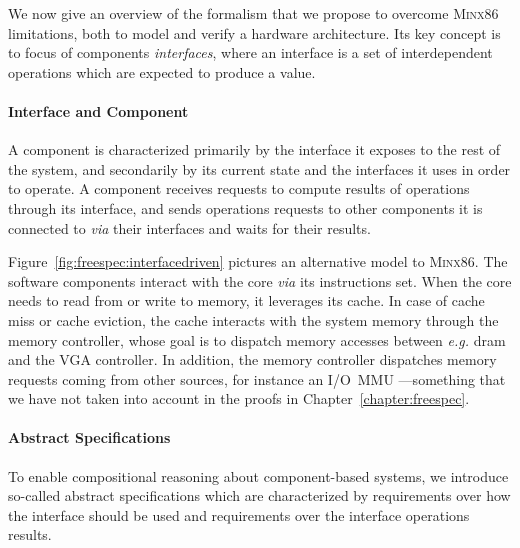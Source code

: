 We now give an overview of the formalism that we propose to
overcome {\scshape Minx86} limitations, both to model and verify a hardware
architecture.
%
Its key concept is to focus of components \emph{interfaces}, where an interface
is a set of interdependent operations which are expected to produce a value.

\paragraph{Interface and Component}
%
A component is characterized primarily by the interface it exposes to the rest
of the system, and secondarily by its current state and the interfaces it uses
in order to operate.
%
A component receives requests to compute results of operations through its
interface, and sends operations requests to other components it is connected to
\emph{via} their interfaces and waits for their results.

\begin{example}
  Figure~\ref{fig:freespec:interfacedriven} pictures an alternative model to
  {\scshape Minx86}.
  The software components interact with the core \emph{via} its instructions
  set.
  When the core needs to read from or write to memory, it leverages its cache.
  In case of cache miss or cache eviction, the cache interacts with the system
  memory through the memory controller, whose goal is to dispatch memory
  accesses between \emph{e.g.} \ac{dram} and the VGA controller.
  In addition, the memory controller dispatches memory requests coming from
  other sources, for instance an I/O~MMU ---something that we have not taken
  into account in the proofs in Chapter~\ref{chapter:freespec}.
\end{example}

\paragraph{Abstract Specifications}
%
To enable compositional reasoning about component-based systems, we introduce
so-called abstract specifications which are characterized by requirements over
how the interface should be used and requirements over the interface operations
results.

